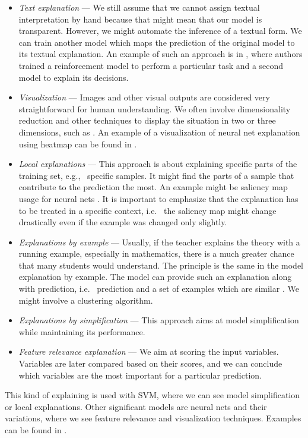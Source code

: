 \begin{itemize}
    \itemsep0em 
    \item \emph{Text explanation} --- We still assume that we cannot assign textual interpretation by hand because that might mean that our model is transparent. However, we might automate the inference of a textual form. We can train another model which maps the prediction of the original model to its textual explanation. An example of such an approach is in \cite{Krening2017}, where authors trained a reinforcement model to perform a particular task and a second model to explain its decisions.
    \item \emph{Visualization} --- Images and other visual outputs are considered very straightforward for human understanding. We often involve dimensionality reduction and other techniques to display the situation in two or three dimensions, such as \cite{Pearson1901}. An example of a visualization of neural net explanation using heatmap can be found in \cite{Zeiler2013}.
    \item \emph{Local explanations} --- This approach is about explaining specific parts of the training set, e.g., \ specific samples. It might find the parts of a sample that contribute to the prediction the most. An example might be saliency map usage for neural nets \cite{Simonyan2014}. It is important to emphasize that the explanation has to be treated in a specific context, i.e. \ the saliency map might change drastically even if the example was changed only slightly.
    \item \emph{Explanations by example} --- Usually, if the teacher explains the theory with a running example, especially in mathematics, there is a much greater chance that many students would understand. The principle is the same in the model explanation by example. The model can provide such an explanation along with prediction, i.e. \ prediction and a set of examples which are similar  \cite{Caruana1999}. We might involve a clustering algorithm.
    \item \emph{Explanations by simplification} --- This approach aims at model simplification while maintaining its performance.
    \item \emph{Feature relevance explanation} --- We aim at scoring the input variables. Variables are later compared based on their scores, and we can conclude which variables are the most important for a particular prediction.
\end{itemize}

This kind of explaining is used with SVM, where we can see model simplification or local explanations. Other significant models are neural nets and their variations, where we see feature relevance and visualization techniques. Examples can be found in \cite{Arrieta2019}.

